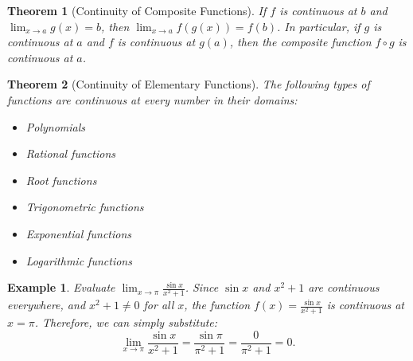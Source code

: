 \documentclass[11pt,a4paper]{article}
\newtheorem{example}{Example}
\newtheorem{theorem}{Theorem}
\begin{document}
\begin{theorem}[Continuity of Composite Functions]
If $f$ is continuous at $b$ and $\displaystyle \lim_{x \to a} g(x) = b$, then $\displaystyle \lim_{x \to a} f(g(x)) = f(b)$. In particular, if $g$ is continuous at $a$ and $f$ is continuous at $g(a)$, then the composite function $f \circ g$ is continuous at $a$.
\end{theorem}
\begin{theorem}[Continuity of Elementary Functions]
The following types of functions are continuous at every number in their domains:
\begin{itemize}
\item Polynomials
\item Rational functions
\item Root functions
\item Trigonometric functions
\item Exponential functions
\item Logarithmic functions
\end{itemize}
\end{theorem}
\begin{example}
Evaluate $\displaystyle \lim_{x \to \pi} \frac{\sin x}{x^2 + 1}$.
Since $\sin x$ and $x^2 + 1$ are continuous everywhere, and $x^2 + 1 \neq 0$ for all $x$, the function $f(x) = \frac{\sin x}{x^2 + 1}$ is continuous at $x = \pi$. Therefore, we can simply substitute:
\[
\lim_{x \to \pi} \frac{\sin x}{x^2 + 1} = \frac{\sin \pi}{\pi^2 + 1} = \frac{0}{\pi^2 + 1} = 0.
\]
\end{example}
\end{document}
